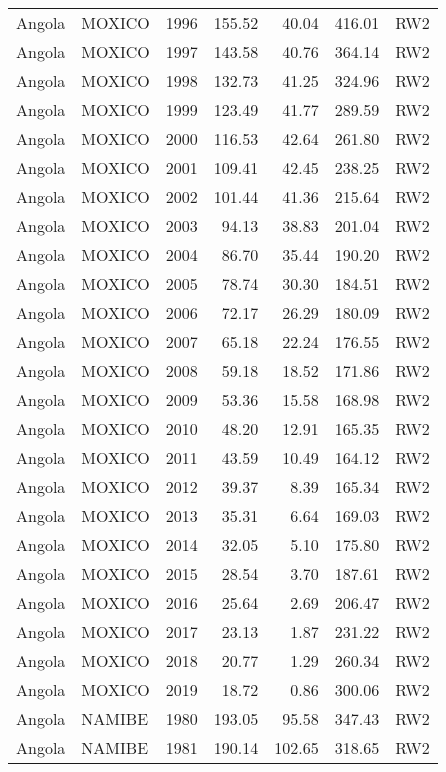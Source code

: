 \begin{longtable}{lllrrrl}
  Angola & MOXICO & 1996 & 155.52 & 40.04 & 416.01 & RW2 \\ 
  Angola & MOXICO & 1997 & 143.58 & 40.76 & 364.14 & RW2 \\ 
  Angola & MOXICO & 1998 & 132.73 & 41.25 & 324.96 & RW2 \\ 
  Angola & MOXICO & 1999 & 123.49 & 41.77 & 289.59 & RW2 \\ 
  Angola & MOXICO & 2000 & 116.53 & 42.64 & 261.80 & RW2 \\ 
  Angola & MOXICO & 2001 & 109.41 & 42.45 & 238.25 & RW2 \\ 
  Angola & MOXICO & 2002 & 101.44 & 41.36 & 215.64 & RW2 \\ 
  Angola & MOXICO & 2003 & 94.13 & 38.83 & 201.04 & RW2 \\ 
  Angola & MOXICO & 2004 & 86.70 & 35.44 & 190.20 & RW2 \\ 
  Angola & MOXICO & 2005 & 78.74 & 30.30 & 184.51 & RW2 \\ 
  Angola & MOXICO & 2006 & 72.17 & 26.29 & 180.09 & RW2 \\ 
  Angola & MOXICO & 2007 & 65.18 & 22.24 & 176.55 & RW2 \\ 
  Angola & MOXICO & 2008 & 59.18 & 18.52 & 171.86 & RW2 \\ 
  Angola & MOXICO & 2009 & 53.36 & 15.58 & 168.98 & RW2 \\ 
  Angola & MOXICO & 2010 & 48.20 & 12.91 & 165.35 & RW2 \\ 
  Angola & MOXICO & 2011 & 43.59 & 10.49 & 164.12 & RW2 \\ 
  Angola & MOXICO & 2012 & 39.37 & 8.39 & 165.34 & RW2 \\ 
  Angola & MOXICO & 2013 & 35.31 & 6.64 & 169.03 & RW2 \\ 
  Angola & MOXICO & 2014 & 32.05 & 5.10 & 175.80 & RW2 \\ 
  Angola & MOXICO & 2015 & 28.54 & 3.70 & 187.61 & RW2 \\ 
  Angola & MOXICO & 2016 & 25.64 & 2.69 & 206.47 & RW2 \\ 
  Angola & MOXICO & 2017 & 23.13 & 1.87 & 231.22 & RW2 \\ 
  Angola & MOXICO & 2018 & 20.77 & 1.29 & 260.34 & RW2 \\ 
  Angola & MOXICO & 2019 & 18.72 & 0.86 & 300.06 & RW2 \\ 
  Angola & NAMIBE & 1980 & 193.05 & 95.58 & 347.43 & RW2 \\ 
  Angola & NAMIBE & 1981 & 190.14 & 102.65 & 318.65 & RW2 \\ 

\end{longtable}
